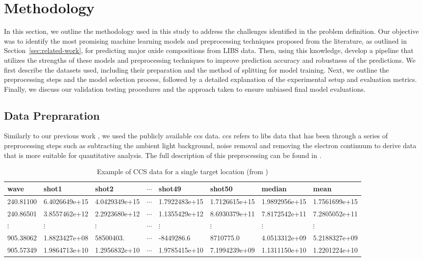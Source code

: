 \section{Methodology}\label{sec:methodology}
In this section, we outline the methodology used in this study to address the challenges identified in the problem definition. Our objective was to identify the most promising machine learning models and preprocessing techniques proposed from the literature, as outlined in Section~\ref{sec:related-work}, for predicting major oxide compositions from LIBS data.
Then, using this knowledge, develop a pipeline that utilizes the strengths of these models and preprocessing techniques to improve prediction accuracy and robustness of the predictions.
We first describe the datasets used, including their preparation and the method of splitting for model training. Next, we outline the preprocessing steps and the model selection process, followed by a detailed explanation of the experimental setup and evaluation metrics. Finally, we discuss our validation testing procedures and the approach taken to ensure unbiased final model evaluations.


\subsection{Data Prepraration}
Similarly to our previous work \citet{p9_paper}, we used the publicly available \gls{ccs} data.
\gls{ccs} refers to \gls{libs} data that has been through a series of preprocessing steps such as subtracting the ambient light background, noise removal and removing the electron continuum to derive data that is more suitable for quantitative analysis.
The full description of this preprocessing can be found in \citet{wiensPreflightCalibrationInitial2013}.

\begin{table*}[h]
\centering
\begin{tabular}{llllllll}
\toprule
     wave &         shot1 &         shot2 &  $\cdots$ &        shot49 &       shot50  & median        & mean          \\
\midrule
240.81100 & 6.4026649e+15 & 4.0429349e+15 & $\cdots$  & 1.7922483e+15 & 1.7126615e+15 & 1.9892956e+15 & 1.7561699e+15 \\
240.86501 & 3.8557462e+12 & 2.2923680e+12 & $\cdots$  & 1.1355429e+12 & 8.6930379e+11 & 7.8172542e+11 & 7.2805052e+11 \\
$\vdots$  & $\vdots$      & $\vdots$      & $\cdots$  & $\vdots$      & $\vdots$      & $\vdots$      & $\vdots$      \\
905.38062 & 1.8823427e+08 & 58500403.     & $\cdots$  & -8449286.6    & 8710775.0     & 4.0513312e+09 & 5.2188327e+09 \\
905.57349 & 1.9864713e+10 & 1.2956832e+10 & $\cdots$  & 1.9785415e+10 & 7.1994239e+09 & 1.1311150e+10 & 1.2201224e+10 \\
\bottomrule
\end{tabular}
\caption{Example of CCS data for a single target location (from \citet{p9_paper})}
\label{tab:ccs_data_example}
\end{table*}

